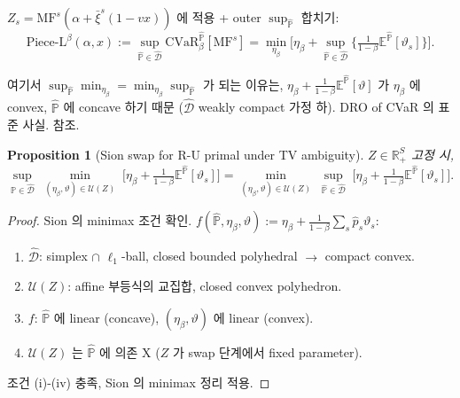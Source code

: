 \documentclass[11pt]{article}
\newcommand{\R}{\mathbb{R}}
\newcommand{\E}{\mathbb{E}}
\newcommand{\Phat}{\hat{\mathbb{P}}}
\newcommand{\Dhat}{\hat{\mathcal{D}}}
\newcommand{\hatp}{\hat{p}}
\newcommand{\barxi}{\bar{\xi}}
\newcommand{\MF}{\mathrm{MF}}
\newcommand{\CVaR}{\mathrm{CVaR}}
\theoremstyle{plain}
\newtheorem{proposition}{Proposition}
\theoremstyle{remark}
\begin{document}
$Z_s = \MF^s(\alpha + \barxi^s(1-vx))$ 에 적용 + outer $\sup_{\Phat}$ 합치기:
\begin{equation}\label{eq:piece-L-RU}
\text{Piece-L}^\beta(\alpha, x) := \sup_{\Phat \in \Dhat}\CVaR_\beta^{\Phat}[\MF^s]
= \min_{\eta_\beta}\Big[\eta_\beta + \sup_{\Phat \in \Dhat}\Big\{\tfrac{1}{1-\beta}\E^{\Phat}[\vartheta_s]\Big\}\Big].
\end{equation}

여기서 $\sup_{\Phat}\min_{\eta_\beta} = \min_{\eta_\beta}\sup_{\Phat}$ 가 되는 이유는, $\eta_\beta + \tfrac{1}{1-\beta}\E^{\Phat}[\vartheta]$ 가 $\eta_\beta$ 에 convex, $\Phat$ 에 concave 하기 때문 ($\Dhat$ weakly compact 가정 하). DRO of CVaR 의 표준 사실. \cite{ling2017robust} 참조.

\begin{proposition}[Sion swap for R-U primal under TV ambiguity]\label{prop:sion-RU}
$Z \in \R_+^S$ 고정 시,
\[
\sup_{\Phat \in \Dhat}\;\min_{(\eta_\beta, \vartheta) \in \mathcal{U}(Z)}\;\Big[\eta_\beta + \tfrac{1}{1-\beta}\E^{\Phat}[\vartheta_s]\Big]
=\min_{(\eta_\beta, \vartheta) \in \mathcal{U}(Z)}\;\sup_{\Phat \in \Dhat}\;\Big[\eta_\beta + \tfrac{1}{1-\beta}\E^{\Phat}[\vartheta_s]\Big].
\]
\end{proposition}

\begin{proof}
Sion 의 minimax 조건 확인. $f(\Phat, \eta_\beta, \vartheta) := \eta_\beta + \tfrac{1}{1-\beta}\sum_s \hatp_s \vartheta_s$:
\begin{enumerate}[label=(\roman*),leftmargin=*,nosep]
\item $\Dhat$: simplex $\cap$ $\ell_1$-ball, closed bounded polyhedral $\to$ compact convex.
\item $\mathcal{U}(Z)$: affine 부등식의 교집합, closed convex polyhedron.
\item $f$: $\Phat$ 에 linear (concave), $(\eta_\beta, \vartheta)$ 에 linear (convex).
\item $\mathcal{U}(Z)$ 는 $\Phat$ 에 의존 X ($Z$ 가 swap 단계에서 fixed parameter).
\end{enumerate}
조건 (i)-(iv) 충족, Sion 의 minimax 정리 적용.
\end{proof}
\end{document}
